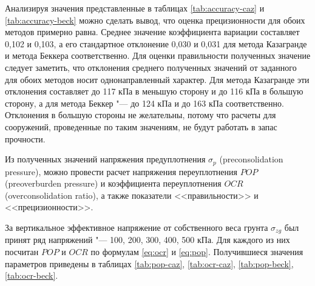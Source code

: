 Анализируя значения представленные в таблицах \ref{tab:accuracy-caz} и \ref{tab:accuracy-beck} можно сделать вывод, что оценка прецизионности для обоих методов примерно равна. Среднее значение коэффициента вариации составляет 0,102 и 0,103, а его стандартное отклонение 0,030 и 0,031 для метода Казагранде и метода Беккера соответственно. Для оценки правильности полученных значение следует заметить, что отклонения среднего полученных значений от заданного для обоих методов носит однонаправленный характер. Для метода Казагранде эти отклонения составляет до 117 кПа в меньшую сторону и до 116 кПа в большую сторону, а для метода Беккер "--- до 124 кПа и до 163 кПа соответственно. Отклонения в большую стороны не желательны, потому что расчеты для сооружений, проведенные по таким значениям, не будут работать в запас прочности.



Из полученных значений напряжения предуплотнения $\sigma_p$ (preconsolidation pressure), можно провести расчет напряжения переуплотнения $POP$ (preoverburden pressure) и коэффициента переуплотнения $OCR$ (overconsolidation ratio), а также показатели <<правильности>> и <<прецизионности>>.


За вертикальное эффективное напряжение от собственного веса грунта $\sigma_{zg}$ был принят ряд напряжений "--- 100, 200, 300, 400, 500 кПа.
Для каждого из них посчитан $POP$ и $OCR$ по формулам \ref{eq:ocr} и \ref{eq:pop}.
Получившиеся значения параметров приведены в таблицах \ref{tab:pop-caz}, \ref{tab:ocr-caz}, \ref{tab:pop-beck}, \ref{tab:ocr-beck}.



